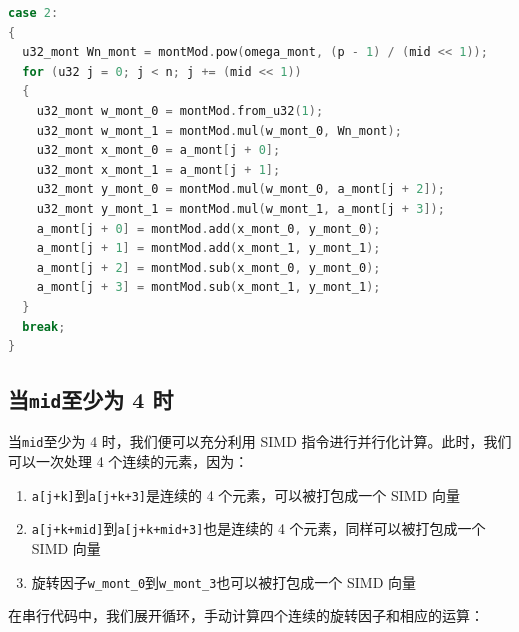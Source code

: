 \documentclass[a4paper]{article}
\begin{document}
\begin{lstlisting}[language=C++]
case 2:
{
  u32_mont Wn_mont = montMod.pow(omega_mont, (p - 1) / (mid << 1));
  for (u32 j = 0; j < n; j += (mid << 1))
  {
    u32_mont w_mont_0 = montMod.from_u32(1);
    u32_mont w_mont_1 = montMod.mul(w_mont_0, Wn_mont);
    u32_mont x_mont_0 = a_mont[j + 0];
    u32_mont x_mont_1 = a_mont[j + 1];
    u32_mont y_mont_0 = montMod.mul(w_mont_0, a_mont[j + 2]);
    u32_mont y_mont_1 = montMod.mul(w_mont_1, a_mont[j + 3]);
    a_mont[j + 0] = montMod.add(x_mont_0, y_mont_0);
    a_mont[j + 1] = montMod.add(x_mont_1, y_mont_1);
    a_mont[j + 2] = montMod.sub(x_mont_0, y_mont_0);
    a_mont[j + 3] = montMod.sub(x_mont_1, y_mont_1);
  }
  break;
}
\end{lstlisting}

\subsection{当\texttt{mid}至少为 4 时}

当\texttt{mid}至少为 4 时，我们便可以充分利用 SIMD 指令进行并行化计算。此时，我们可以一次处理 4 个连续的元素，因为：

\begin{enumerate}
    \item \texttt{a[j+k]}到\texttt{a[j+k+3]}是连续的 4 个元素，可以被打包成一个 SIMD 向量
    \item \texttt{a[j+k+mid]}到\texttt{a[j+k+mid+3]}也是连续的 4 个元素，同样可以被打包成一个 SIMD 向量
    \item 旋转因子\texttt{w\_mont\_0}到\texttt{w\_mont\_3}也可以被打包成一个 SIMD 向量
\end{enumerate}

在串行代码中，我们展开循环，手动计算四个连续的旋转因子和相应的运算：
\end{document}

